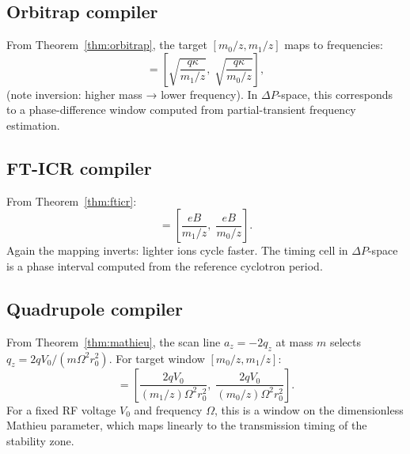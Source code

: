\documentclass[twocolumn,10pt,a4paper]{article}
\theoremstyle{thmstyle}
\theoremstyle{definition}
\theoremstyle{remark}
\newcommand{\DP}{\Delta P}
\begin{document}
\subsection{Orbitrap compiler}

From Theorem~\ref{thm:orbitrap}, the target $[m_0/z, m_1/z]$ maps to
frequencies:
\begin{equation}
[\omega_1, \omega_0] = \left[\sqrt{\frac{q\kappa}{m_1/z}},\;\sqrt{\frac{q\kappa}{m_0/z}}\right],
\label{eq:orb-cell}
\end{equation}
(note inversion: higher mass → lower frequency). In $\DP$-space, this
corresponds to a phase-difference window computed from partial-transient
frequency estimation.

\subsection{FT-ICR compiler}

From Theorem~\ref{thm:fticr}:
\begin{equation}
[\omega_{c,1}, \omega_{c,0}] = \left[\frac{eB}{m_1/z},\; \frac{eB}{m_0/z}\right].
\label{eq:icr-cell}
\end{equation}
Again the mapping inverts: lighter ions cycle faster. The timing cell
in $\DP$-space is a phase interval computed from the reference cyclotron
period.

\subsection{Quadrupole compiler}

From Theorem~\ref{thm:mathieu}, the scan line $a_z = -2q_z$ at mass
$m$ selects $q_z = 2qV_0/(m\Omega^2 r_0^2)$. For target window
$[m_0/z, m_1/z]$:
\begin{equation}
[q_{z,\min}, q_{z,\max}] = \left[\frac{2qV_0}{(m_1/z)\Omega^2 r_0^2},\;
\frac{2qV_0}{(m_0/z)\Omega^2 r_0^2}\right].
\label{eq:quad-cell}
\end{equation}
For a fixed RF voltage $V_0$ and frequency $\Omega$, this is a window
on the dimensionless Mathieu parameter, which maps linearly to the
transmission timing of the stability zone.
\end{document}
